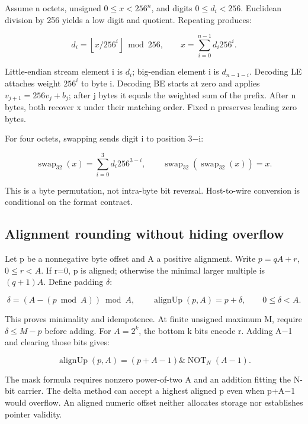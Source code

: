 Assume n octets, unsigned \(0\le x<256^n\), and digits \(0\le d_i<256\). Euclidean division by 256 yields a low digit and quotient. Repeating produces:

\[
d_i=\left\lfloor x/256^i\right\rfloor\bmod256,\qquad
x=\sum_{i=0}^{n-1}d_i256^i.
\]

Little-endian stream element i is \(d_i\); big-endian element i is \(d_{n-1-i}\). Decoding LE attaches weight \(256^i\) to byte i. Decoding BE starts at zero and applies \(v_{j+1}=256v_j+b_j\); after j bytes it equals the weighted sum of the prefix. After n bytes, both recover x under their matching order. Fixed n preserves leading zero bytes.

For four octets, swapping sends digit i to position 3−i:

\[
\operatorname{swap}_{32}(x)=\sum_{i=0}^{3}d_i256^{3-i},\qquad
\operatorname{swap}_{32}(\operatorname{swap}_{32}(x))=x.
\]

This is a byte permutation, not intra-byte bit reversal. Host-to-wire conversion is conditional on the format contract.

\subsection{Alignment rounding without hiding overflow}\label{01-foundations-i-ch011-alignment-rounding-without-hiding-overflow}

\hypertarget{01-foundations-i-ch011-alignment-rounding-without-hiding-overflow}{}

Let p be a nonnegative byte offset and A a positive alignment. Write \(p=qA+r\), \(0\le r<A\). If r=0, p is aligned; otherwise the minimal larger multiple is \((q+1)A\). Define padding \(\delta\):

\[
\delta=(A-(p\bmod A))\bmod A,\qquad
\operatorname{alignUp}(p,A)=p+\delta,\qquad 0\le\delta<A.
\]

This proves minimality and idempotence. At finite unsigned maximum M, require \(\delta\le M-p\) before adding. For \(A=2^k\), the bottom k bits encode r. Adding A−1 and clearing those bits gives:

\[
\operatorname{alignUp}(p,A)=(p+A-1)\mathbin{\&}\operatorname{NOT}_N(A-1).
\]

The mask formula requires nonzero power-of-two A and an addition fitting the N-bit carrier. The delta method can accept a highest aligned p even when p+A−1 would overflow. An aligned numeric offset neither allocates storage nor establishes pointer validity.

